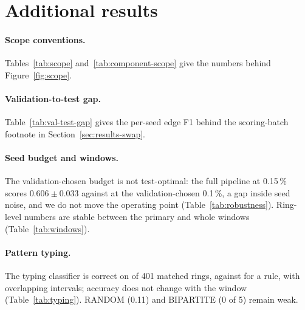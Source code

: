 \section{Additional results}
\label{app:tables}

\paragraph{Scope conventions.}
Tables~\ref{tab:scope} and~\ref{tab:component-scope} give the numbers behind
Figure~\ref{fig:scope}.




\paragraph{Validation-to-test gap.}
Table~\ref{tab:val-test-gap} gives the per-seed edge F1 behind the scoring-batch footnote in
Section~\ref{sec:results-swap}.



\paragraph{Seed budget and windows.}
The validation-chosen budget is not test-optimal: the full pipeline at 0.15\,\% scores
$0.606 \pm 0.033$ against  at the validation-chosen 0.1\,\%, a gap
inside seed noise, and we do not move the operating point (Table~\ref{tab:robustness}).
Ring-level numbers are stable between the primary and whole windows
(Table~\ref{tab:windows}).




\paragraph{Pattern typing.}
The typing classifier is correct on  of 401 matched rings, against
 for a rule, with overlapping intervals; accuracy does not change with
the window (Table~\ref{tab:typing}). RANDOM (0.11) and BIPARTITE (0 of 5) remain weak.



